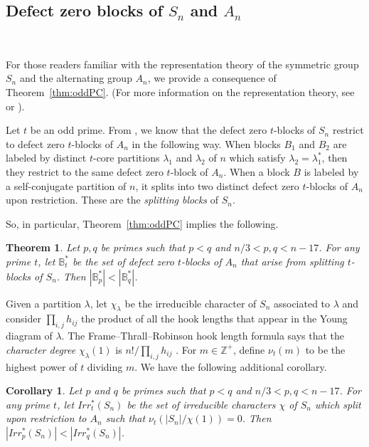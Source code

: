 \documentclass[12pt,leqno]{amsart}
\newtheorem{cor}[lem]{Corollary}
\newtheorem{thm}[lem]{Theorem}
\numberwithin{equation}{section}
\theoremstyle{definition}
\begin{document}
\subsection{Defect zero blocks of $S_n$ and $A_n$}\

For those readers familiar with the representation theory of the symmetric group $S_n$ and the alternating group $A_n$, we provide a consequence of Theorem~\ref{thm:oddPC}.  (For more information on the representation theory, see \cite[Chapter 4]{JamesKerber} or \cite[Chapter 6]{Olsson1}).

Let $t$ be an odd prime. From \cite[Proposition 12.2]{Olsson1}, we know that the defect zero $t$-blocks of $S_n$
restrict to defect zero $t$-blocks of $A_n$ in the following way.  When blocks $B_1$ and $B_2$ are labeled by distinct $t$-core partitions $\lambda_1$ and $\lambda_2$ of $n$ which satisfy ${\lambda}_2={\lambda}_1^*$, then they restrict to the same defect zero $t$-block of $A_n$.  When a block $B$ is labeled by a self-conjugate partition of $n$, it splits into two distinct defect zero $t$-blocks of $A_n$ upon restriction.  These are the {\em splitting blocks} of $S_n$.

So, in particular, Theorem~\ref{thm:oddPC} implies the following.

\begin{thm}
Let $p,q$ be primes such that $p<q$ and $n/3<p,q<n-17$. For any prime $t$, let ${\mathbb B}^*_t$ be the set of defect zero $t$-blocks of $A_n$ that arise from splitting $t$-blocks of $S_n$.  Then $|{\mathbb B}^*_p|<|{\mathbb B}^*_q|$.
\end{thm}

Given a partition $\lambda$, let $\chi_{\lambda}$ be the irreducible character of $S_n$ associated to ${\lambda}$ and consider $\prod_{i,j}h_{ij}$ the product of all the hook lengths that appear in the Young diagram of $\lambda$. The Frame--Thrall--Robinson hook length formula says that the {\it character degree} $\chi_{\lambda}(1)$ is $n!/ \prod_{i,j}h_{ij}$ \cite{Frame}. For $m\in\mathbb{Z}^+$, define $\nu_t(m)$ to be the highest power of $t$ dividing $m$.  We have the following additional corollary.

\begin{cor}
Let $p$ and $q$ be primes such that $p<q$ and $n/3<p,q<n-17$. For any prime $t$, let $Irr^*_{t}(S_n)$ be the set of irreducible characters $\chi$ of $S_n$ which split upon restriction to $A_n$ such that $\nu_{t}(|S_n|/\chi(1))=0$. Then $|Irr^*_{p}(S_n)| < |Irr^*_{q}(S_n)|$.
\end{cor}
\end{document}
